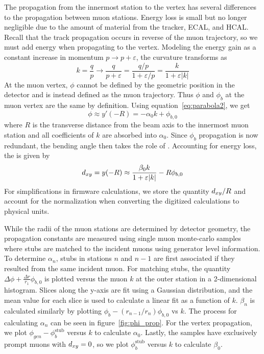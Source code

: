 The propagation from the innermost station to the vertex has several differences to the propagation between muon stations. Energy loss is small but no longer negligible due to the amount of material from the tracker, ECAL, and HCAL. Recall that the track propagation occurs in reverse of the muon trajectory, so we must add energy when propagating to the vertex. Modeling the energy gain as a constant increase in momentum $p\to p+\varepsilon$, the curvature transforms as
\begin{equation}
	\label{eq:energygain}
	k=\frac{q}{p}\to\frac{q}{p+\varepsilon}=\frac{q/p}{1+\varepsilon/p}=\frac{k}{1+\varepsilon|k|}
\end{equation}
At the muon vertex, $\phi$ cannot be defined by the geometric position in the detector and is instead defined as the muon trajectory. Thus $\phi$ and $\phi_b$ at the muon vertex are the same by definition. Using equation~\ref{eq:parabola2}, we get
\begin{equation}
	\label{eq:vertex_phi}
	\phi\approx y'(-R)=-\alpha_0k+\phi_{b,0}
\end{equation}
where $R$ is the transverse distance from the beam axis to the innermost muon station and all coefficients of $k$ are absorbed into $\alpha_0$. Since $\phi_b$ propagation is now redundant, the bending angle then takes the role of \dxy. Accounting for energy loss, the \dxy is given by
\begin{equation}
	\label{eq:vertex_dxy}
	d_{xy}=y(-R)\approx \frac{\beta_0k}{1+\varepsilon|k|}-R\phi_{b,0}
\end{equation}
For simplifications in firmware calculations, we store the quantity $d_{xy}/R$ and account for the normalization when converting the digitized calculations to physical units.

While the radii of the muon stations are determined by detector geometry, the propagation constants  are measured using single muon monte-carlo samples where stubs are matched to the incident muons using generator level information. To determine $\alpha_n$, stubs in stations $n$ and $n-1$ are first associated if they resulted from the same incident muon. For matching stubs, the quantity $\Delta\phi+\frac{\Delta r}{r_1}\phi_{b,0}$ is plotted versus the muon $k$ at the outer station in a 2-dimensional histogram. Slices along the y-axis are fit using a Gaussian distribution, and the mean value for each slice is used to calculate a linear fit as a function of $k$. $\beta_n$ is calculated similarly by plotting $\phi_b-\left(r_{n-1}/r_n\right)\phi_{b,0}$ vs $k$. The process for calculating $\alpha_n$ can be seen in figure~\ref{fig:phi_prop}. For the vertex propagation, we plot $\phi_{gen}-\phi_b^\text{stub}$ versus $k$ to calculate $\alpha_0$. Lastly, the samples have exclusively prompt muons with $d_{xy}=0$, so we plot $\phi_b^\text{stub}$ versus $k$ to calculate $\beta_0$.

